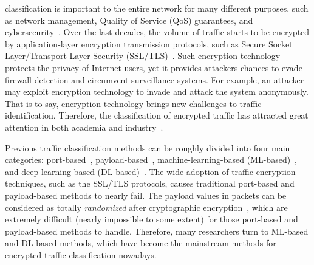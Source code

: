 
% 
% 
% 
% 
 classification is important to the entire network for many different purposes, such as network management, Quality of Service (QoS) guarantees,  and cybersecurity~\cite{shi2018efficient, bujlow2015independent,taylor2016appscanner}. %
Over the last decades, the volume of traffic starts to be encrypted by application-layer encryption transmission protocols, such as Secure Socket Layer/Transport Layer Security (SSL/TLS)~\cite{dierks2008transport, freier2011secure}. 
Such encryption technology protects the privacy of Internet users, yet it provides attackers chances to evade firewall detection and circumvent surveillance systems. 
For example, an attacker may exploit encryption technology to invade and attack the system anonymously. 
That is to say, encryption technology brings new challenges to traffic identification. 
Therefore, the classification of encrypted traffic has attracted great attention in both academia and industry~\cite{vu2018time}.

Previous traffic classification methods can be roughly divided into four main categories: port-based~\cite{mcpherson2004portvis}, payload-based~\cite{finsterbusch2013survey,moore2005toward}, %
machine-learning-based (ML-based)~\cite{holland2021new, taylor2017robust}, %
and deep-learning-based (DL-based)~\cite{liu2019fs,lotfollahi2017deep}. %
The wide adoption of traffic encryption techniques, such as the SSL/TLS protocols, causes traditional port-based and payload-based methods to nearly fail. The payload values in packets can be considered as totally \emph{randomized} after cryptographic encryption~\cite{velan2015survey}, which are extremely difficult (nearly impossible to some extent) for those port-based and payload-based methods to handle.
Therefore, many researchers turn to ML-based and DL-based methods, which have become the mainstream methods for encrypted traffic classification nowadays. 

